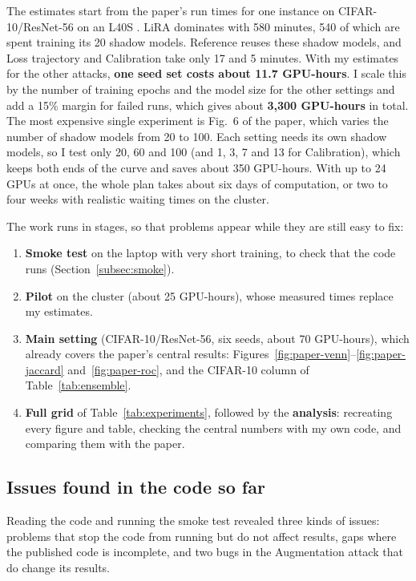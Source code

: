 \documentclass[a4paper]{article}
\begin{document}
The estimates start from the paper's run times for one instance on CIFAR-10/ResNet-56 on an L40S \citep[extended version, App.~C.1]{wang2025mia}.
LiRA dominates with 580 minutes, 540 of which are spent training its 20 shadow models.
Reference reuses these shadow models, and Loss trajectory and Calibration take only 17 and 5 minutes.
With my estimates for the other attacks, \textbf{one seed set costs about 11.7 GPU-hours}.
I scale this by the number of training epochs and the model size for the other settings and add a 15\% margin for failed runs, which gives about \textbf{3{,}300 GPU-hours} in total.
The most expensive single experiment is Fig.~6 of the paper, which varies the number of shadow models from 20 to 100.
Each setting needs its own shadow models, so I test only 20, 60 and 100 (and 1, 3, 7 and 13 for Calibration), which keeps both ends of the curve and saves about 350 GPU-hours.
With up to 24 GPUs at once, the whole plan takes about six days of computation, or two to four weeks with realistic waiting times on the cluster.

The work runs in stages, so that problems appear while they are still easy to fix:
\begin{enumerate}
  \item \textbf{Smoke test} on the laptop with very short training, to check that the code runs (Section~\ref{subsec:smoke}).
  \item \textbf{Pilot} on the cluster (about 25 GPU-hours), whose measured times replace my estimates.
  \item \textbf{Main setting} (CIFAR-10/ResNet-56, six seeds, about 70 GPU-hours), which already covers the paper's central results: Figures~\ref{fig:paper-venn}--\ref{fig:paper-jaccard} and~\ref{fig:paper-roc}, and the CIFAR-10 column of Table~\ref{tab:ensemble}.
  \item \textbf{Full grid} of Table~\ref{tab:experiments}, followed by the \textbf{analysis}: recreating every figure and table, checking the central numbers with my own code, and comparing them with the paper.
\end{enumerate}

\subsection{Issues found in the code so far}
\label{subsec:issues}

Reading the code and running the smoke test revealed three kinds of issues: problems that stop the code from running but do not affect results, gaps where the published code is incomplete, and two bugs in the Augmentation attack that do change its results.
\end{document}
